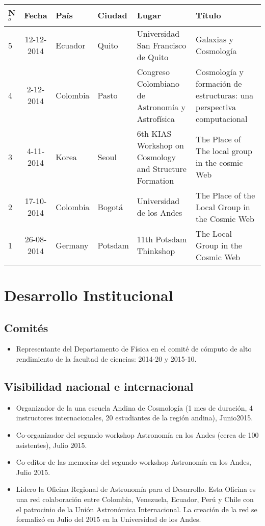 \documentclass{article}
\begin{document}
\begin{tabular}{l c l l p{2cm} p{5cm}}\hline
N$^{o}$ & Fecha & Pa\'is & Ciudad & Lugar & T\'itulo \\\hline
5 & 12-12-2014 & Ecuador & Quito & Universidad San Francisco de Quito & Galaxias y Cosmolog\'ia\\
4 & 2-12-2014 & Colombia & Pasto & Congreso Colombiano de Astronom\'ia y Astrof\'isica & Cosmolog\'ia y formaci\'on de estructuras: una perspectiva computacional\\
3 & 4-11-2014 & Korea & Seoul & 6th KIAS Workshop on Cosmology and Structure Formation & The Place of The local group in the cosmic Web\\
2 & 17-10-2014 & Colombia & Bogot\'a & Universidad de los Andes & The
Place of the Local Group in the Cosmic Web\\
1 & 26-08-2014 & Germany & Potsdam & 11th Potsdam Thinkshop & The Local
Group in the Cosmic Web\\ \hline
\end{tabular}
\section{Desarrollo Institucional}

\subsection{Comit\'es}
\begin{itemize}
\item {Representante del Departamento de F\'isica en el comit\'e
  de c\'omputo de alto rendimiento de la facultad de ciencias}:
  2014-20 y 2015-10.  
\end{itemize}


\subsection{Visibilidad nacional e internacional}
\begin{itemize}
\item {Organizador de la una escuela Andina de Cosmolog\'ia (1 mes de
  duraci\'on, 4 instructores internacionales, 20 estudiantes de la
  regi\'on andina), Junio2015.}
\item {Co-organizador del segundo workshop Astronom\'ia en los Andes
  (cerca de 100 asistentes), Julio 2015.}
\item {Co-editor de las memorias del segundo workshop Astronom\'ia en
  los Andes, Julio 2015.}
\item {Lidero la Oficina Regional de Astronom\'ia para el
  Desarrollo. Esta Oficina es una red colaboraci\'on entre Colombia,
  Venezuela, Ecuador, Per\'u y Chile con el patrocinio de la Uni\'on
  Astron\'omica Internacional. La creaci\'on de la red se formaliz\'o
  en Julio del 2015 en la Universidad de los Andes.}   
\end{itemize}
\end{document}
